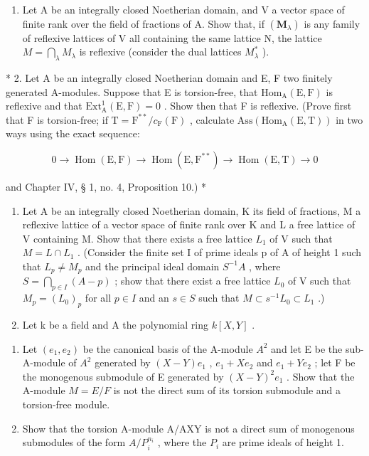 
\begin{enumerate}
\def\labelenumi{\arabic{enumi}.}
\tightlist
\item
  Let A be an integrally closed Noetherian domain, and V a vector space of finite rank over the field of fractions of A. Show that, if \((\mathbf{M}_{\lambda})\) is any family of reflexive lattices of V all containing the same lattice N, the lattice \(M = \bigcap_{\lambda} M_{\lambda}\) is reflexive (consider the dual lattices \(M_{\lambda}^{*}\) ).
\end{enumerate}

* 2. Let A be an integrally closed Noetherian domain and E, F two finitely generated A-modules. Suppose that E is torsion-free, that \(\mathrm{Hom}_{\mathrm{A}}(\mathrm{E},\mathrm{F})\) is reflexive and that \(\mathrm{Ext}_{\mathrm{A}}^{1}(\mathrm{E},\mathrm{F}) = 0\) . Show then that F is reflexive. (Prove first that F is torsion-free; if \(\mathrm{T} = \mathrm{F}^{**}/c_{\mathrm{F}}(\mathrm{F})\) , calculate \(\mathrm{Ass}(\mathrm{Hom}_{\mathrm{A}}(\mathrm{E},\mathrm{T}))\) in two ways using the exact sequence:

\[
0 \rightarrow \operatorname{Hom} (\mathrm{E}, \mathrm{F}) \rightarrow \operatorname{Hom} (\mathrm{E}, \mathrm{F} ^ {* *}) \rightarrow \operatorname{Hom} (\mathrm{E}, \mathrm{T}) \rightarrow 0
\]

and Chapter IV, § 1, no. 4, Proposition 10.) *

\begin{enumerate}
\def\labelenumi{\arabic{enumi}.}
\setcounter{enumi}{2}
\item
  Let A be an integrally closed Noetherian domain, K its field of fractions, M a reflexive lattice of a vector space of finite rank over K and L a free lattice of V containing M. Show that there exists a free lattice \(L_{1}\) of V such that \(M = L \cap L_{1}\) . (Consider the finite set I of prime ideals p of A of height 1 such that \(L_{p} \neq M_{p}\) and the principal ideal domain \(S^{-1}A\) , where \(S = \bigcap_{p \in I} (A - p)\) ; show that there exist a free lattice \(L_{0}\) of V such that \(M_{p} = (L_{0})_{p}\) for all \(p \in I\) and an \(s \in S\) such that \(M \subset s^{-1}L_{0} \subset L_{1}\) .)
\item
  Let k be a field and A the polynomial ring \(k[X, Y]\) .
\end{enumerate}

\begin{enumerate}
\def\labelenumi{(\alph{enumi})}
\item
  Let \((e_1, e_2)\) be the canonical basis of the A-module \(A^2\) and let E be the sub-A-module of \(A^2\) generated by \((X - Y)e_1\) , \(e_1 + Xe_2\) and \(e_1 + Ye_2\) ; let F be the monogenous submodule of E generated by \((X - Y)^2e_1\) . Show that the A-module \(M = E / F\) is not the direct sum of its torsion submodule and a torsion-free module.
\item
  Show that the torsion A-module A/AXY is not a direct sum of monogenous submodules of the form \(A/P_{i}^{n_{i}}\) , where the \(P_{i}\) are prime ideals of height 1.
\end{enumerate}

